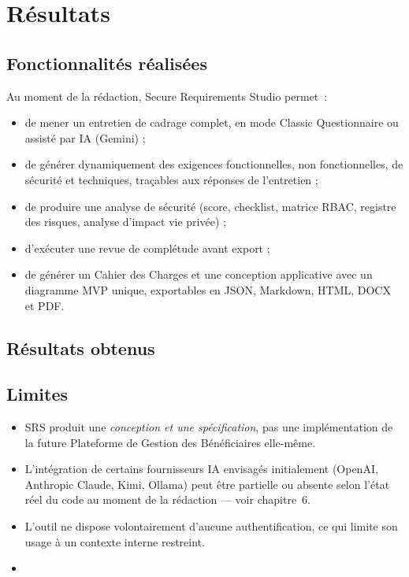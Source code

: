 \chapter{Résultats}

\section{Fonctionnalités réalisées}
Au moment de la rédaction, Secure Requirements Studio permet~:
\begin{itemize}
    \item de mener un entretien de cadrage complet, en mode Classic Questionnaire ou
    assisté par IA (Gemini) ;
    \item de générer dynamiquement des exigences fonctionnelles, non fonctionnelles, de
    sécurité et techniques, traçables aux réponses de l'entretien ;
    \item de produire une analyse de sécurité (score, checklist, matrice RBAC, registre
    des risques, analyse d'impact vie privée) ;
    \item d'exécuter une revue de complétude avant export ;
    \item de générer un Cahier des Charges et une conception applicative avec un
    diagramme MVP unique, exportables en JSON, Markdown, HTML, DOCX et PDF.
\end{itemize}

\section{Résultats obtenus}

\section{Limites}
\begin{itemize}
    \item SRS produit une \emph{conception et une spécification}, pas une implémentation
    de la future Plateforme de Gestion des Bénéficiaires elle-même.
    \item L'intégration de certains fournisseurs IA envisagés initialement (OpenAI,
    Anthropic Claude, Kimi, Ollama) peut être partielle ou absente selon l'état réel du
    code au moment de la rédaction — voir chapitre~6.
    \item L'outil ne dispose volontairement d'aucune authentification, ce qui limite
    son usage à un contexte interne restreint.
    \item {}
\end{itemize}

